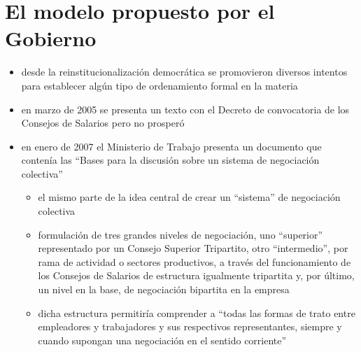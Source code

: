 \documentclass[spanish,12pt,a4paper,titlepage]{report}
\begin{document}
\section{El modelo propuesto por el Gobierno}

\begin{itemize}
\item desde la reinstitucionalización democrática se promovieron diversos intentos  para establecer algún tipo de ordenamiento formal en la materia
\item en marzo de 2005 se presenta un texto con el Decreto de convocatoria de los Consejos de Salarios pero no prosperó
\item en enero de 2007 el Ministerio de Trabajo presenta un documento que contenía las “Bases para la discusión sobre un sistema de negociación colectiva”
\begin{itemize}
\item el mismo parte de la idea central de crear un “sistema” de negociación colectiva
\item formulación de tres grandes niveles de negociación, uno “superior” representado por un Consejo Superior Tripartito, otro “intermedio”, por rama de actividad o sectores productivos, a través del funcionamiento de los Consejos de Salarios de estructura igualmente tripartita y, por último, un nivel en la base, de negociación bipartita en la empresa
\item dicha estructura permitiría comprender a “todas las formas de trato entre empleadores y trabajadores y sus respectivos representantes, siempre y cuando supongan una negociación en el sentido corriente”
\end{itemize}

\end{itemize}
\end{document}
